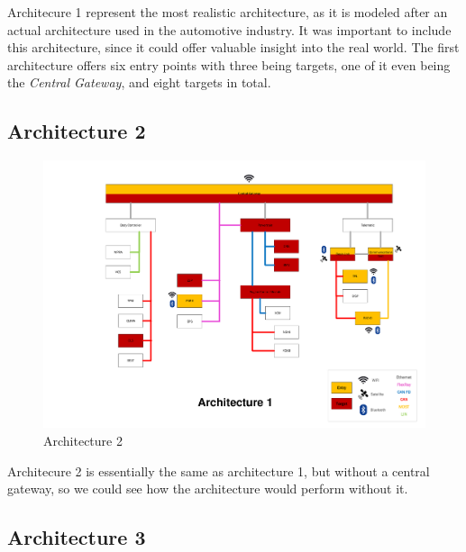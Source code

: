Architecure 1 represent the most realistic architecture, as it is modeled after an actual architecture used in the automotive industry.
It was important to include this architecture, since it could offer valuable insight into the real world.
The first architecture offers six entry points with three being targets, one of it even being the \textit{Central Gateway}, and eight targets in total.
\par


\subsection*{Architecture 2}
\label{sec:arch2}	

\begin{figure}[h!]
    \caption{Architecture 2}
    \includegraphics[width=\textwidth, page=2]{../Architectures-survey.pdf}
\end{figure}

Architecure 2 is essentially the same as architecture 1, but without a central gateway, 
so we could see how the architecture would perform without it.\par


\subsection*{Architecture 3}
\label{sec:arch3}

